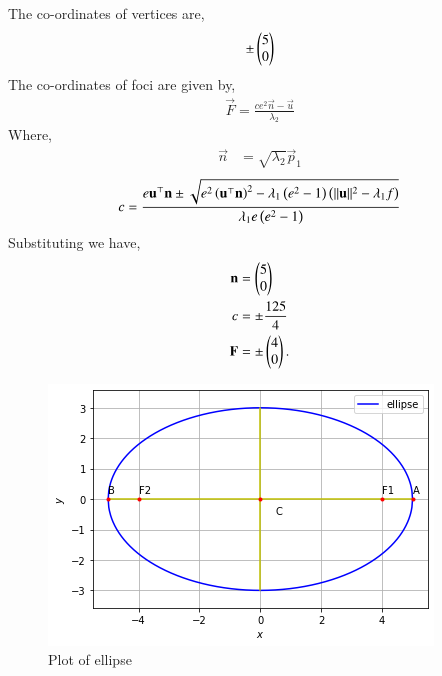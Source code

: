 \documentclass[journal,12pt,twocolumn]{IEEEtran}
\begin{document}
The co-ordinates of vertices are,
\begin{align}
   \pm\begin{pmatrix}5 \\ 0\end{pmatrix} 
\end{align}
The co-ordinates of foci are given by,
\begin{align}
  \vec{F}  = \frac{ce^2\vec{n}-\vec{u}}{\lambda_2}
\end{align}
Where,
\begin{align}
    \vec{n} &= \sqrt{\lambda_2}\vec{p}_1
\end{align}
\begin{multline}
     c = \frac{e\mathbf{u}^{\top}\mathbf{n} \pm \sqrt{e^2\left(\mathbf{u}^{\top}\mathbf{n}\right)^2-\lambda_1\left(e^2-1\right)\left(\lVert\mathbf{u}\rVert^2 - \lambda_1 f\right)}}{\lambda_1e\left(e^2-1\right)} 
\end{multline}
Substituting we have,
\begin{align}
    \mathbf{n} &= \begin{pmatrix}5\\0\end{pmatrix}\\ c &= \pm\frac{125}{4}\\
    \mathbf{F} &= \pm\begin{pmatrix}4 \\ 0\end{pmatrix}.
\end{align}

\begin{figure}[h!]
\centering
\includegraphics[width=\columnwidth]{EE3900_Graph.png}
\caption{Plot of ellipse}
\label{fig:ellipse}
\end{figure}
\end{document}
